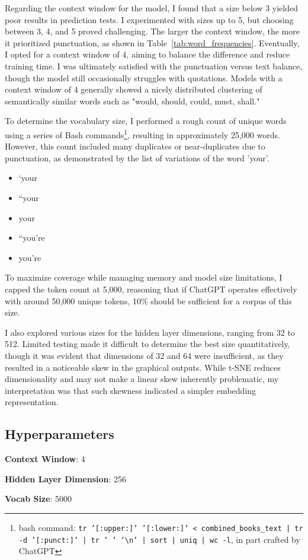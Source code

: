 \documentclass[12pt]{article} \usepackage{COSC420style} \usepackage{soul}
\begin{document}
Regarding the context window for the model, I found that a size below 3 yielded poor results in
prediction tests. I experimented with sizes up to 5, but choosing between 3, 4, and 5 proved
challenging. The larger the context window, the more it prioritized punctuation, as shown in
Table~\ref{tab:word_frequencies}. Eventually, I opted for a context window of 4, aiming to balance
the difference and reduce training time. I was ultimately satisfied with the punctuation versus text
balance, though the model still occasionally struggles with quotations. Models with a context window
of 4 generally showed a nicely distributed clustering of semantically similar words such as "would,
should, could, must, shall."

To determine the vocabulary size, I performed a rough count of unique words using a series of Bash
commands\footnote{bash command: \texttt{tr '[:upper:]' '[:lower:]' < combined\_books\_text | tr -d
'[:punct:]' | tr ' ' '\textbackslash{}n' | sort | uniq | wc -l}, in part crafted by ChatGPT},
resulting in approximately 25,000 words. However, this count included many duplicates or
near-duplicates due to punctuation, as demonstrated by the list of variations of the word 'your'.

\begin{itemize}
	\item   ‘your
	\item   “your
	\item   your
	\item   “you’re
	\item   you’re
\end{itemize}

To maximize coverage while managing memory and model size limitations, I capped the token count at
5,000, reasoning that if ChatGPT operates effectively with around 50,000 unique tokens, 10\% should
be sufficient for a corpus of this size.

I also explored various sizes for the hidden layer dimensions, ranging from 32 to 512. Limited
testing made it difficult to determine the best size quantitatively, though it was evident that
dimensions of 32 and 64 were insufficient, as they resulted in a noticeable skew in the graphical
outputs. While t-SNE reduces dimensionality and may not make a linear skew inherently problematic,
my interpretation was that such skewness indicated a simpler embedding representation.

\subsection{Hyperparameters}
\begin{itemize}
	{\small
	\item \textbf{Context Window}: 4
	\item \textbf{Hidden Layer Dimension}: 256
	\item \textbf{Vocab Size}: 5000
	      }
\end{itemize}
\end{document}

